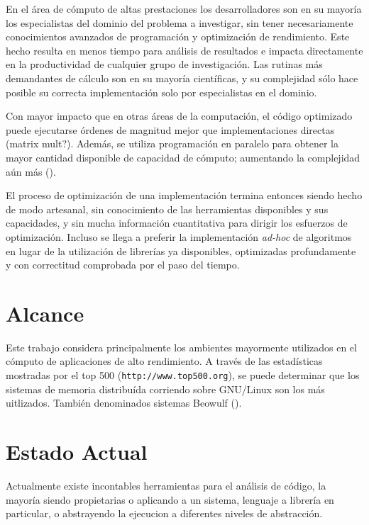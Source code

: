 \documentclass[a4paper]{report}
\begin{document}
En el \'area de c\'omputo de altas prestaciones los desarrolladores son en su mayor\'ia los
especialistas del dominio del problema a investigar, sin tener necesariamente conocimientos
avanzados de programaci\'on y optimizaci\'on de rendimiento. Este hecho resulta en menos tiempo para
an\'alisis de resultados e impacta directamente en la productividad de cualquier grupo de investigaci\'on.
Las rutinas m\'as demandantes de c\'alculo  son en su mayor\'ia cient\'ificas, y su complejidad s\'olo hace
posible su correcta implementaci\'on solo por especialistas en el dominio.

\bigskip

Con mayor impacto que en otras \'areas de la computaci\'on, el c\'odigo optimizado puede ejecutarse
\'ordenes de magnitud mejor que implementaciones directas (matrix mult?). Adem\'as, se utiliza programaci\'on en paralelo
para obtener la mayor cantidad disponible de capacidad de c\'omputo; aumentando la complejidad a\'un m\'as (\cite{parallel-programming}).

\bigskip

El proceso de optimizaci\'on de una implementaci\'on termina entonces siendo hecho de modo artesanal,
sin conocimiento de las herramientas disponibles y sus capacidades, y sin mucha informaci\'on cuantitativa
para dirigir los esfuerzos de optimizaci\'on.
Incluso se llega a preferir la implementaci\'on {\em ad-hoc} de algoritmos en lugar de la utilizaci\'on de librer\'ias
ya disponibles, optimizadas profundamente y con correctitud comprobada por el paso del tiempo.

\section{Alcance}

Este trabajo considera principalmente los ambientes mayormente utilizados en el c\'omputo de aplicaciones de alto rendimiento.
A trav\'es de las estad\'isticas mostradas por el top 500 ({\tt http://www.top500.org}), se puede determinar que los sistemas de memoria distribu\'ida
corriendo sobre GNU/Linux son los m\'as uitlizados. Tambi\'en denominados sistemas Beowulf (\cite{beowulf}).

\section{Estado Actual}

Actualmente existe incontables herramientas para el an\'alisis de c\'odigo, la mayor\'ia siendo propietarias
o aplicando a un sistema, lenguaje a librer\'ia en particular, o abstrayendo la ejecucion a diferentes niveles de abstracci\'on.
\end{document}
